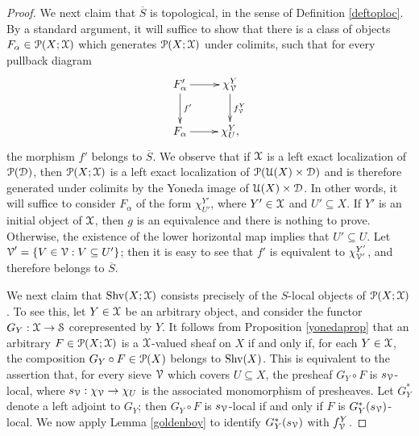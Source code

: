 \begin{proof}
We next claim that $\overline{S}$ is topological, in the sense of Definition \ref{deftoploc}.
By a standard argument, it will suffice to show that there is a class of objects
$F_{\alpha} \in \operatorname{\mathcal{P}}(X; \operatorname{\mathcal{X}})$ which generates $\operatorname{\mathcal{P}}(X; \operatorname{\mathcal{X}})$ under colimits, such that
for every pullback diagram
$$ \xymatrix{ F'_{\alpha} \ar[d]^{f'} \ar[r] & \chi^{Y}_{\calV} \ar[d]^{f^{Y}_{\calV}} \\
F_{\alpha} \ar[r] & \chi^{Y}_{U}, }$$
the morphism $f'$ belongs to $\overline{S}$. We observe that if
$\operatorname{\mathcal{X}}$ is a left exact localization of $\operatorname{\mathcal{P}}(\operatorname{\mathcal{D}})$, then $\operatorname{\mathcal{P}}(X; \operatorname{\mathcal{X}})$ is a left
exact localization of $\operatorname{\mathcal{P}}( \operatorname{\mathcal{U}}(X) \times \operatorname{\mathcal{D}})$ and is therefore generated under colimits
by the Yoneda image of $\operatorname{\mathcal{U}}(X) \times \operatorname{\mathcal{D}}$. In other words, it will suffice to consider 
$F_{\alpha}$ of the form $\chi^{Y'}_{U'}$, where $Y' \in \operatorname{\mathcal{X}}$ and $U' \subseteq X$.
If $Y'$ is an initial object of $\operatorname{\mathcal{X}}$, then $g$ is an equivalence and there is nothing to prove. Otherwise, the existence of the lower horizontal map implies that $U' \subseteq U$. 
Let $\operatorname{\mathcal V}' = \{ V \in \operatorname{\mathcal V}: V \subseteq U' \}$; then it is easy to see that $f'$ is
equivalent to $\chi^{Y'}_{\operatorname{\mathcal V}'}$, and therefore belongs to $\overline{S}$.

We next claim that $\operatorname{Shv}(X; \operatorname{\mathcal{X}})$ consists precisely of the $S$-local objects of
$\operatorname{\mathcal{P}}(X; \operatorname{\mathcal{X}})$. To see this, let $Y \in \operatorname{\mathcal{X}}$ be an arbitrary object, and consider
the functor $G_Y: \operatorname{\mathcal{X}} \rightarrow \operatorname{\mathcal{S}}$ corepresented by $Y$. It follows from Proposition \ref{yonedaprop} that an arbitrary $F \in \operatorname{\mathcal{P}}(X; \operatorname{\mathcal{X}})$ is a $\operatorname{\mathcal{X}}$-valued sheaf on $X$ if and only if, for each $Y \in \operatorname{\mathcal{X}}$, the composition $G_Y \circ F \in \operatorname{\mathcal{P}}(X)$ belongs to $\operatorname{Shv}(X)$.
This is equivalent to the assertion that, for every sieve $\operatorname{\mathcal V}$ which covers $U \subseteq X$,
the presheaf $G_Y \circ F$ is $s_{\operatorname{\mathcal V}}$-local, where $s_{\operatorname{\mathcal V}}: \chi_{\operatorname{\mathcal V}} \rightarrow \chi_{U}$ is the associated monomorphism of presheaves. Let $G^{\ast}_Y$ denote a left adjoint to $G_{Y}$; then $G_Y \circ F$ is $s_{\operatorname{\mathcal V}}$-local if and only if $F$ is $G^{\ast}_{Y}(s_{\operatorname{\mathcal V}})$-local. We now apply Lemma \ref{goldenboy} to identify $G^{\ast}_{Y}(s_{\operatorname{\mathcal V}})$ with $f_{\operatorname{\mathcal V}}^{Y}$.


\end{proof}
